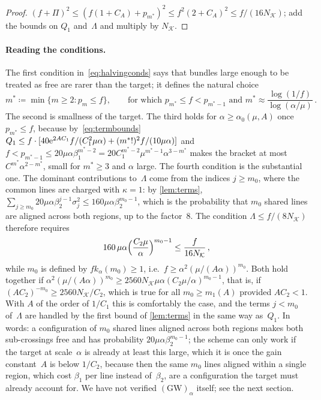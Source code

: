 \documentclass[11pt,letterpaper]{article}
\begin{document}
\begin{proof}
$(f+\Pi)^2\le(f(1+C_A)+p_{m^*})^2\le f^2(2+C_A)^2\le f/(16N_{\mathcal K})$; add the bounds on $Q_1$ and~$\Lambda$ and multiply by $N_{\mathcal K}$.
\end{proof}

\paragraph{Reading the conditions.} The first condition in~\eqref{eq:halvingconds} says that bundles large enough to be treated as free are rarer than the target; it defines the natural choice
\begin{equation}
\label{eq:mstar}
  m^*\coloneqq\min\{m\ge2\colon p_m\le f\},\qquad\text{for which }p_{m^*}\le f<p_{m^*-1}\text{ and }m^*\approx\frac{\log(1/f)}{\log(\alpha/\mu)}\,.
\end{equation} The second is smallness of the target. The third holds for $\alpha\ge\alpha_0(\mu,A)$ once $p_{m^*}\le f$, because by~\eqref{eq:termbounds} $Q_1\le f\cdot[40\mathrm{e}^{2AC_1}f/(C_1^2\mu\alpha)+(m^*!)^2f/(10\mu\alpha)]$ and $f<p_{m^*-1}\le20\mu\alpha\beta_1^{m^*-2}=20C_1^{m^*-2}\mu^{m^*-1}\alpha^{3-m^*}$ makes the bracket at most $C^{m^*}\alpha^{2-m^*}$, small for $m^*\ge3$ and $\alpha$ large. The fourth condition is the substantial one. The dominant contributions to~$\Lambda$ come from the indices $j\ge m_0$, where the common lines are charged with $\kappa=1$: by \cref{lem:terms}, $\sum_{j\ge m_0}20\mu\alpha\beta_2^{j-1}\sigma_j^2\le160\mu\alpha\beta_2^{m_0-1}$, which is the probability that $m_0$ shared lines are aligned across both regions, up to the factor~$8$. The condition $\Lambda\le f/(8N_{\mathcal K})$ therefore requires
\begin{equation}
\label{eq:across}
  160\,\mu\alpha\Bigl(\frac{C_2\mu}{\alpha}\Bigr)^{m_0-1}\le\frac{f}{16N_{\mathcal K}}\,,
\end{equation}
while $m_0$ is defined by $fk_\alpha(m_0)\ge1$, i.e.\ $f\ge\alpha^2(\mu/(A\alpha))^{m_0}$. Both hold together if $\alpha^2(\mu/(A\alpha))^{m_0}\ge2560N_{\mathcal K}\mu\alpha(C_2\mu/\alpha)^{m_0-1}$, that is, if $(AC_2)^{-m_0}\ge2560N_{\mathcal K}/C_2$, which is true for all $m_0\ge m_1(A)$ provided $AC_2<1$. With $A$ of the order of $1/C_1$ this is comfortably the case, and the terms $j<m_0$ of~$\Lambda$ are handled by the first bound of \cref{lem:terms} in the same way as~$Q_1$. In words: a configuration of $m_0$ shared lines aligned across both regions makes both sub-crossings free and has probability $20\mu\alpha\beta_2^{m_0-1}$; the scheme can only work if the target at scale~$\alpha$ is already at least this large, which it is once the gain constant~$A$ is below $1/C_2$, because then the same $m_0$ lines aligned within a single region, which cost $\beta_1$ per line instead of~$\beta_2$, are a configuration the target must already account for. We have not verified $\mathrm{(GW)}_\alpha$ itself; see the next section.
\end{document}
